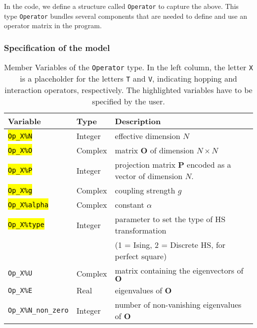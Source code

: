In the code, we define a structure called \texttt{Operator} to capture the above. 
This type \texttt{Operator} bundles several components that are needed to define and use an operator matrix in the program.  

\subsubsection{Specification of the model}\label{sec:specific}
%
\begin{table}[h]
   \begin{tabular}{l l l}
    Variable & Type & Description \\\hline
    \hl{\texttt{Op\_X\%N}}       & Integer     &  effective dimension $N$ \\
    \hl{\texttt{Op\_X\%O}}       & Complex    &  matrix  $\mathbf{O}$  of dimension $N \times N$\\
    \hl{\texttt{Op\_X\%P}}       & Integer   &  projection matrix $\mathbf{P}$  encoded as a vector of dimension $N$.\\
    \hl{\texttt{Op\_X\%g}}       & Complex    &  coupling strength $g$ \\  
    \hl{\texttt{Op\_X\%alpha}}   & Complex  &  constant $\alpha$ \\
    \hl{\texttt{Op\_X\%type}}    & Integer   &  parameter to set the type of 
                                             HS transformation\\
                             &   &  (1 = Ising, 2 = Discrete HS, for perfect square)  \\ 
    \texttt{Op\_X\%U}            & Complex &  matrix containing the eigenvectors of $\mathbf{O}$  \\
    \texttt{Op\_X\%E}            & Real &  eigenvalues of $\mathbf{O}$ \\
    \texttt{Op\_X\%N\_non\_zero} & Integer &  number of non-vanishing eigenvalues of $\mathbf{O}$ 
   \end{tabular}
   \caption{Member Variables of the \texttt{Operator}  type. 
   In the left column, the letter \texttt{X} is a placeholder for the letters \texttt{T} and \texttt{V}, 
   indicating hopping and interaction operators, respectively.
   The highlighted variables have to be specified by the user. 
    \label{table:operator}}
\end{table}
